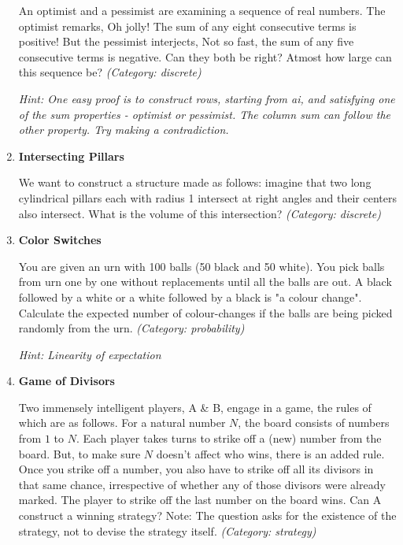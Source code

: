 \begin{enumerate}
An optimist and a pessimist are examining a sequence of real numbers. The optimist remarks, Oh jolly! The sum of any eight consecutive terms is positive! But the pessimist interjects, Not so fast, the sum of any five consecutive terms is negative. Can they both be right? Atmost how large can this sequence be?
\small\emph{(Category: discrete)}

\small\emph{Hint: One easy proof is to construct rows, starting from ai, and satisfying one of the sum properties - optimist or pessimist. The column sum can follow the other property. Try making a contradiction.}





\item \textbf{Intersecting Pillars}

We want to construct a structure made as follows: imagine that two long cylindrical pillars each with radius 1 intersect at right angles and their centers also intersect. What is the volume of this intersection?
\small\emph{(Category: discrete)}




\item \textbf{Color Switches}

You are given an urn with 100 balls (50 black and 50 white). You pick balls from urn one by one without replacements until all the balls are out. A black followed by a white or a white followed by a black is "a colour change". Calculate the expected number of colour-changes if the balls are being picked randomly from the urn.
\small\emph{(Category: probability)}

\small\emph{Hint: Linearity of expectation}





\item \textbf{Game of Divisors}

Two immensely intelligent players, A \& B, engage in a game, the rules of which are as follows. For a natural number $N$, the board consists of numbers from $1$ to $N$. Each player takes turns to strike off a (new) number from the board. But, to make sure $N$ doesn't affect who wins, there is an added rule. Once you strike off a number, you also have to strike off all its divisors in that same chance, irrespective of whether any of those divisors were already marked. The player to strike off the last number on the board wins.
Can A construct a winning strategy?
Note: The question asks for the existence of the strategy, not to devise the strategy itself.
\small\emph{(Category: strategy)}


\end{enumerate}
